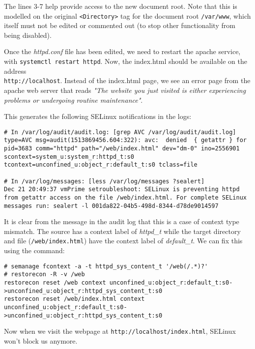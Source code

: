 \noindent
The lines 3-7 help provide access to the new document root. Note that this is modelled on the original \verb|<Directory>| tag for the document root \verb|/var/www|, which itself must not be edited or commented out (to stop other functionality from being disabled). 

Once the \textit{httpd.conf} file has been edited, we need to restart the apache service, with \verb|systemctl restart httpd|. Now, the index.html should be available on the address \\ \verb|http://localhost|. Instead of the index.html page, we see an error page from the apache web server that reads \textit{"The website you just visited is either experiencing problems or undergoing routine maintenance"}.

This generates the following SELinux notifications in the logs:

\vspace{-15pt}
\begin{verbatim}
# In /var/log/audit/audit.log: [grep AVC /var/log/audit/audit.log]
type=AVC msg=audit(1513869456.604:322): avc:  denied  { getattr } for  pid=3683 comm="httpd" path="/web/index.html" dev="dm-0" ino=2556901 scontext=system_u:system_r:httpd_t:s0 tcontext=unconfined_u:object_r:default_t:s0 tclass=file

# In /var/log/messages: [less /var/log/messages ?sealert]
Dec 21 20:49:37 vmPrime setroubleshoot: SELinux is preventing httpd from getattr access on the file /web/index.html. For complete SELinux messages run: sealert -l 001da822-04b5-498d-8344-d78de9014597
\end{verbatim}
\vspace{-10pt}

\noindent
It is clear from the message in the audit log that this is a case of context type mismatch. The source has a context label of \textit{httpd\_t} while the target directory and file (\verb|/web/index.html|) have the context label of \textit{default\_t}. We can fix this using the command:

\vspace{-15pt}
\begin{verbatim}
# semanage fcontext -a -t httpd_sys_content_t '/web(/.*)?'
# restorecon -R -v /web
restorecon reset /web context unconfined_u:object_r:default_t:s0->unconfined_u:object_r:httpd_sys_content_t:s0
restorecon reset /web/index.html context unconfined_u:object_r:default_t:s0->unconfined_u:object_r:httpd_sys_content_t:s0
\end{verbatim}
\vspace{-10pt}

\noindent
Now when we visit the webpage at \verb|http://localhost/index.html|, SELinux won't block us anymore. 

